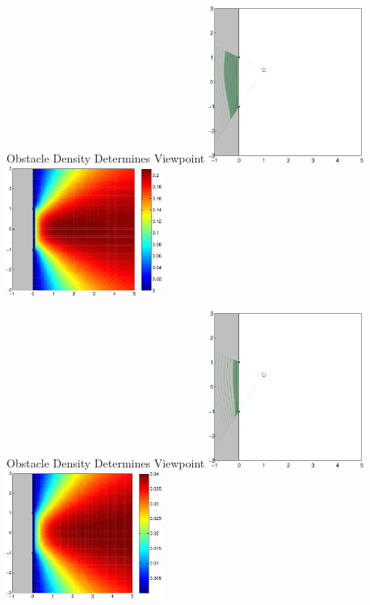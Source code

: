 \addtocounter{framenumber}{-1}
\begin{tframe}{Obstacle Density Determines Viewpoint}
\includegraphics[width=2in]{media_exploration/penetration5}
\includegraphics[width=2in]{media_exploration/JEnergy5}
\end{tframe}

\addtocounter{framenumber}{-1}
\begin{tframe}{Obstacle Density Determines Viewpoint}
\includegraphics[width=2in]{media_exploration/penetration25}
\includegraphics[width=2in]{media_exploration/JEnergy25}
\end{tframe}

